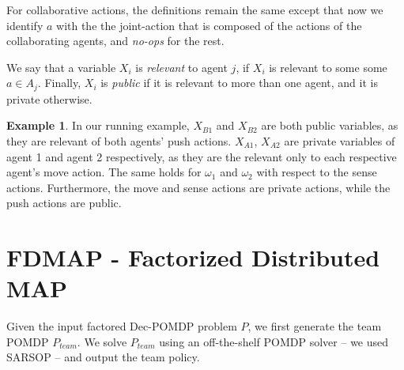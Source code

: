 \documentclass[letterpaper]{article} %
\theoremstyle{definition}
\newtheorem{example}{Example}
\newcommand{\commentout}[1]{}
\begin{document}
For collaborative actions, the definitions remain the same except that now we identify $a$ with the the joint-action that is composed of the actions of the collaborating agents, and {\em no-ops} for the rest.

We say that a variable $X_i$ is \emph{relevant} to agent $j$, if  $X_i$ is relevant to some some $a\in A_j$.
Finally, $X_i$ is \emph{public} if it is relevant to more than one agent, and it is private otherwise.

\begin{example}
In our running example, $X_{B1}$ and $X_{B2}$ are both public variables, as they are relevant of both agents' push actions.
$X_{A1}$, $X_{A2}$ are private variables of agent 1 and agent 2 respectively, as they are the relevant only to each respective agent's move action. The same holds for $\omega_1$ and $\omega_2$ with respect to the sense actions.
Furthermore, the move and sense actions are private actions, while the push actions are public.
\end{example}



\section{FDMAP - Factorized Distributed MAP}
\commentout{
We produce policy policy graphs for the agents in three steps. First, we generate a team solution using a POMDP for the centralized problem. Next, we generate single agent POMDPs in which each agent attempts to fulfill its part in the team solution. Finally, the policies obtained from the single agent POMDPs are synchronized. 

Given the input factored Dec-POMDP problem $P$, we first generate the team POMDP $P_{team}$. $P_{team}$ is identical to $P$, ignoring the underlying multi-agent structure. That is, the actions are the joint actions and the observations are the joint observation, viewed as applied 
and observed by a single agent. Equivalently, this can be viewed as a Dec-POMDP in which all observations are communicated accurately and instantaneously to all agents.}

Given the input factored Dec-POMDP problem $P$, we first generate the team POMDP $P_{team}$. We solve $P_{team}$ using an off-the-shelf POMDP solver -- we used SARSOP \cite{SARSOP} -- and output the team policy. 
\end{document}
